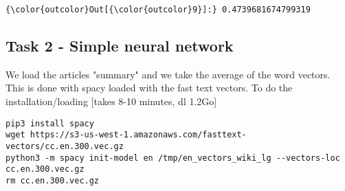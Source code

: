 \documentclass[11pt]{article}
\begin{document}
\begin{Verbatim}[commandchars=\\\{\}]
{\color{outcolor}Out[{\color{outcolor}9}]:} 0.4739681674799319
\end{Verbatim}
            
    \subsection{Task 2 - Simple neural
network}\label{task-2---simple-neural-network}

    We load the articles "summary" and we take the average of the word
vectors. This is done with spacy loaded with the fast text vectors. To
do the installation/loading {[}takes 8-10 minutes, dl 1.2Go{]}

\begin{verbatim}
pip3 install spacy
wget https://s3-us-west-1.amazonaws.com/fasttext-vectors/cc.en.300.vec.gz
python3 -m spacy init-model en /tmp/en_vectors_wiki_lg --vectors-loc cc.en.300.vec.gz
rm cc.en.300.vec.gz
\end{verbatim}
\end{document}
